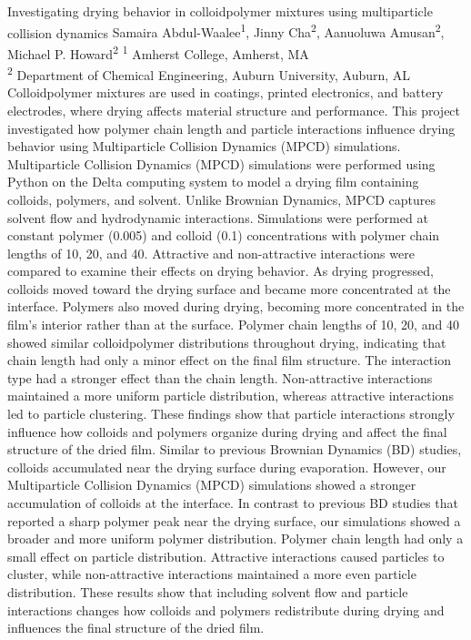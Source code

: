 \makeabstract
    {
    Investigating drying behavior in colloid{\textendash}polymer mixtures using multiparticle collision dynamics 
    }
    {
    Samaira Abdul-Waalee\textsuperscript{1}, Jinny Cha\textsuperscript{2}, Aanuoluwa Amusan\textsuperscript{2}, Michael P. Howard\textsuperscript{2}
    }
    {
    \textsuperscript{1} Amherst College, Amherst, MA \\
\textsuperscript{2} Department of Chemical Engineering, Auburn University, Auburn, AL
    }
    {
    Colloid{\textendash}polymer mixtures are used in coatings, printed electronics, and battery electrodes, where drying affects material structure and performance. This project investigated how polymer chain length and particle interactions influence drying behavior using Multiparticle Collision Dynamics (MPCD) simulations.
    }
    {
    Multiparticle Collision Dynamics (MPCD) simulations were performed using Python on the Delta computing system to model a drying film containing colloids, polymers, and solvent. Unlike Brownian Dynamics, MPCD captures solvent flow and hydrodynamic interactions. Simulations were performed at constant polymer (0.005) and colloid (0.1) concentrations with polymer chain lengths of 10, 20, and 40. Attractive and non-attractive interactions were compared to examine their effects on drying behavior.
    }
    {
    As drying progressed, colloids moved toward the drying surface and became more concentrated at the interface. Polymers also moved during drying, becoming more concentrated in the film's interior rather than at the surface. Polymer chain lengths of 10, 20, and 40 showed similar colloid{\textendash}polymer distributions throughout drying, indicating that chain length had only a minor effect on the final film structure. The interaction type had a stronger effect than the chain length. Non-attractive interactions maintained a more uniform particle distribution, whereas attractive interactions led to particle clustering. These findings show that particle interactions strongly influence how colloids and polymers organize during drying and affect the final structure of the dried film.
    }
    {
    Similar to previous Brownian Dynamics (BD) studies, colloids accumulated near the drying surface during evaporation. However, our Multiparticle Collision Dynamics (MPCD) simulations showed a stronger accumulation of colloids at the interface. In contrast to previous BD studies that reported a sharp polymer peak near the drying surface, our simulations showed a broader and more uniform polymer distribution. Polymer chain length had only a small effect on particle distribution. Attractive interactions caused particles to cluster, while non-attractive interactions maintained a more even particle distribution. These results show that including solvent flow and particle interactions changes how colloids and polymers redistribute during drying and influences the final structure of the dried film.
    }

    \newpage
    
